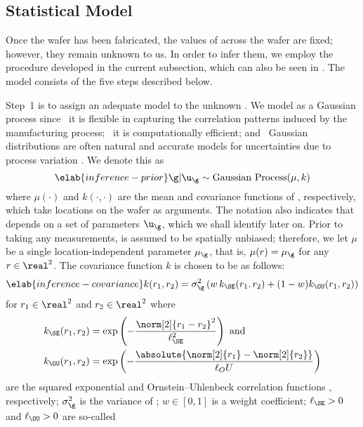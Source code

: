\subsection{Statistical Model}

Once the wafer has been fabricated, the values of \g across the wafer are fixed;
however, they remain unknown to us. In order to infer them, we employ the
procedure developed in the current subsection, which can also be seen in
. The model consists of the five steps
described below.

Step~1 is to assign an adequate model to the unknown \g. We model \g as a
Gaussian process \cite{rasmussen2006} since \one~it is flexible in capturing the
correlation patterns induced by the manufacturing process; \two~it is
computationally efficient; and \three~Gaussian distributions are often natural
and accurate models for uncertainties due to process variation
\cite{srivastava2010, reda2009, juan2012}. We denote this as
\begin{equation} \elab{inference-prior}
  \g | \u_\g \sim \mathrm{Gaussian\ Process}(\mu, k)
\end{equation}
where $\mu(\cdot)$ and $k(\cdot, \cdot)$ are the mean and covariance functions
of \g, respectively, which take locations on the wafer as arguments. The
notation also indicates that \g depends on a set of parameters $\u_\g$, which we
shall identify later on. Prior to taking any measurements, \g is assumed to be
spatially unbiased; therefore, we let $\mu$ be a single location-independent
parameter $\mu_\g$, that is, $\mu(r) = \mu_\g$ for any $r \in \real^2$. The
covariance function $k$ is chosen to be as follows:
\begin{equation} \elab{inference-covariance}
  k(r_1, r_2) = \sigma_\g^2 \left(w \, k_\SE(r_1, r_2) + (1 - w) k_\OU(r_1, r_2)\right)
\end{equation}
for $r_1 \in \real^2$ and $r_2 \in \real^2$ where
\begin{align*}
  k_\SE(r_1, r_2) & = \exp\left(-\frac{\norm[2]{r_1 - r_2}^2}{\ell_\SE^2}\right) \text{ and} \\
  k_\OU(r_1, r_2) & = \exp\left(-\frac{\absolute{\norm[2]{r_1} - \norm[2]{r_2}}}{\ell_OU}\right)
\end{align*}
are the squared exponential and Ornstein--Uhlenbeck correlation functions
\cite{rasmussen2006}, respectively; $\sigma_\g^2$ is the variance of \g; $w \in
[0, 1]$ is a weight coefficient; $\ell_\SE > 0$ and $\ell_\OU > 0$ are so-called
